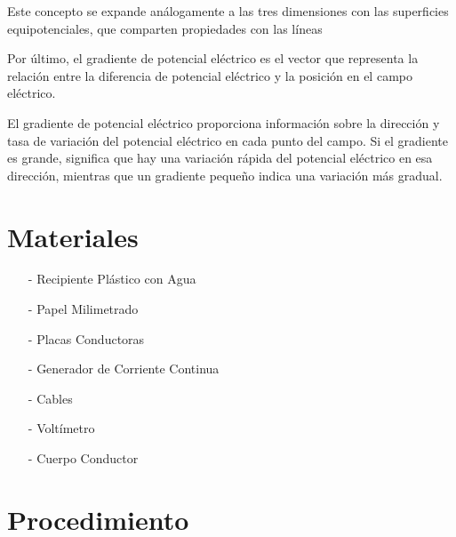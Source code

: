 \documentclass{article}
\begin{document}
Este concepto se expande análogamente a las tres dimensiones con las superficies equipotenciales, que comparten propiedades con las líneas

Por último, el gradiente de potencial eléctrico es el vector que representa la relación entre la diferencia de potencial eléctrico y la posición en el campo eléctrico.

El gradiente de potencial eléctrico proporciona información sobre la dirección y tasa de variación del potencial eléctrico en cada punto del campo. Si el gradiente es grande, significa que hay una variación rápida del potencial eléctrico en esa dirección, mientras que un gradiente pequeño indica una variación más gradual.

\vfill

\section{Materiales}

\begin{itemize}
  \item [-] Recipiente Plástico con Agua
  \item [-] Papel Milimetrado
  \item [-] Placas Conductoras
  \item [-] Generador de Corriente Continua
  \item [-] Cables
  \item [-] Voltímetro
  \item [-] Cuerpo Conductor
\end{itemize}

\section{Procedimiento}
\end{document}
